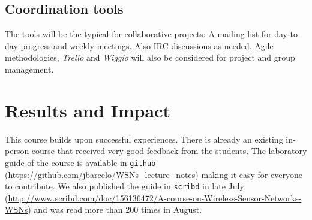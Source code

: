 \documentclass[a4paper,oneside]{book}   %
\begin{document}


\subsection{Coordination tools}
The tools will be the typical for collaborative projects:
A mailing list for day-to-day progress and weekly meetings.
Also IRC discussions as needed.
Agile methodologies, \emph{Trello} and \emph{Wiggio} will also be considered for project and group management.


\section{Results and Impact}

This course builds upon successful experiences. There is already an existing in-person course that received very good feedback from the students.
The laboratory guide of the course is available in \texttt{github} (\url{https://github.com/jbarcelo/WSNs_lecture_notes}) making it easy for everyone to contribute.
We also published the guide in \texttt{scribd} in late July (\url{http://www.scribd.com/doc/156136472/A-course-on-Wireless-Sensor-Networks-WSNs}) and was read more than 200 times in August.
\end{document}
